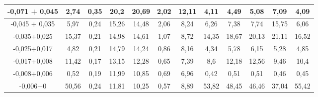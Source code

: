{\begin{longtable}[c]{|p{}ccccccccccc|}
\multicolumn{1}{|c|}{-0,071 + 0,045} & \multicolumn{1}{c|}{2,74} & \multicolumn{1}{c|}{0,35} & \multicolumn{1}{c|}{20,2} & \multicolumn{1}{c|}{20,69} & \multicolumn{1}{c|}{2,02} & \multicolumn{1}{c|}{12,11} & \multicolumn{1}{c|}{4,11} & \multicolumn{1}{c|}{4,49} & \multicolumn{1}{c|}{5,08} & \multicolumn{1}{c|}{7,09} & 4,09 \\ \hline
\multicolumn{1}{|c|}{-0,045 + 0,035} & \multicolumn{1}{c|}{5,97} & \multicolumn{1}{c|}{0,24} & \multicolumn{1}{c|}{15,26} & \multicolumn{1}{c|}{14,48} & \multicolumn{1}{c|}{2,06} & \multicolumn{1}{c|}{8,24} & \multicolumn{1}{c|}{6,26} & \multicolumn{1}{c|}{7,38} & \multicolumn{1}{c|}{7,74} & \multicolumn{1}{c|}{15,75} & 6,06 \\ \hline
\multicolumn{1}{|c|}{-0,035+0,025} & \multicolumn{1}{c|}{15,37} & \multicolumn{1}{c|}{0,21} & \multicolumn{1}{c|}{14,98} & \multicolumn{1}{c|}{14,61} & \multicolumn{1}{c|}{1,07} & \multicolumn{1}{c|}{8,72} & \multicolumn{1}{c|}{14,35} & \multicolumn{1}{c|}{18,67} & \multicolumn{1}{c|}{20,13} & \multicolumn{1}{c|}{21,11} & 16,52 \\ \hline
\multicolumn{1}{|c|}{-0,025+0,017} & \multicolumn{1}{c|}{4,82} & \multicolumn{1}{c|}{0,21} & \multicolumn{1}{c|}{14,79} & \multicolumn{1}{c|}{14,24} & \multicolumn{1}{c|}{0,86} & \multicolumn{1}{c|}{8,16} & \multicolumn{1}{c|}{4,34} & \multicolumn{1}{c|}{5,78} & \multicolumn{1}{c|}{6,15} & \multicolumn{1}{c|}{5,28} & 4,85 \\ \hline
\multicolumn{1}{|c|}{-0,017+0,008} & \multicolumn{1}{c|}{11,42} & \multicolumn{1}{c|}{0,17} & \multicolumn{1}{c|}{13,15} & \multicolumn{1}{c|}{12,28} & \multicolumn{1}{c|}{0,65} & \multicolumn{1}{c|}{7,39} & \multicolumn{1}{c|}{8,6} & \multicolumn{1}{c|}{12,18} & \multicolumn{1}{c|}{12,56} & \multicolumn{1}{c|}{9,46} & 10,4 \\ \hline
\multicolumn{1}{|c|}{-0,008+0,006} & \multicolumn{1}{c|}{0,52} & \multicolumn{1}{c|}{0,19} & \multicolumn{1}{c|}{11,99} & \multicolumn{1}{c|}{10,85} & \multicolumn{1}{c|}{0,69} & \multicolumn{1}{c|}{6,96} & \multicolumn{1}{c|}{0,42} & \multicolumn{1}{c|}{0,51} & \multicolumn{1}{c|}{0,51} & \multicolumn{1}{c|}{0,46} & 0,45 \\ \hline
\multicolumn{1}{|c|}{-0,006+0} & \multicolumn{1}{c|}{50,56} & \multicolumn{1}{c|}{0,24} & \multicolumn{1}{c|}{11,81} & \multicolumn{1}{c|}{10,25} & \multicolumn{1}{c|}{0,57} & \multicolumn{1}{c|}{8,89} & \multicolumn{1}{c|}{53,82} & \multicolumn{1}{c|}{48,45} & \multicolumn{1}{c|}{46,46} & \multicolumn{1}{c|}{37,04} & 55,42 \\ \hline

\end{longtable}}
